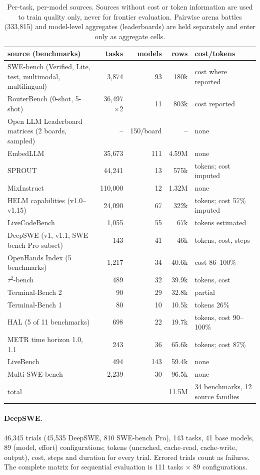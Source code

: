 \documentclass[11pt,a4paper]{article}
\theoremstyle{definition}
\theoremstyle{remark}
\theoremstyle{definition}
\begin{document}
\begin{table}[h]
\centering\small
\begin{tabularx}{\textwidth}{Xrrrl}\toprule
source (benchmarks) & tasks & models & rows & cost/tokens\\\midrule
SWE-bench (Verified, Lite, test, multimodal, multilingual) & 3{,}874 & 93 & 180k & cost where reported\\
RouterBench (0-shot, 5-shot) & 36{,}497$\times$2 & 11 & 803k & cost reported\\
Open LLM Leaderboard matrices (2 boards, sampled) & -- & 150/board & -- & none\\
EmbedLLM & 35{,}673 & 111 & 4.59M & none\\
SPROUT & 44{,}241 & 13 & 575k & tokens; cost imputed\\
MixInstruct & 110{,}000 & 12 & 1.32M & none\\
HELM capabilities (v1.0--v1.15) & 24{,}090 & 67 & 322k & tokens; cost 57\% imputed\\
LiveCodeBench & 1{,}055 & 55 & 67k & tokens estimated\\
DeepSWE (v1, v1.1, SWE-bench Pro subset) & 143 & 41 & 46k & tokens, cost, steps\\
OpenHands Index (5 benchmarks) & 1{,}217 & 34 & 40.6k & cost 86--100\%\\
$\tau^2$-bench & 489 & 32 & 39.9k & tokens, cost\\
Terminal-Bench 2 & 90 & 29 & 32.8k & partial\\
Terminal-Bench 1 & 80 & 10 & 10.5k & tokens 26\%\\
HAL (5 of 11 benchmarks) & 698 & 22 & 19.7k & tokens, cost 90--100\%\\
METR time horizon 1.0, 1.1 & 243 & 36 & 65.6k & tokens; cost 87\%\\
LiveBench & 494 & 143 & 59.4k & none\\
Multi-SWE-bench & 2{,}239 & 30 & 96.5k & none\\
\midrule
total & & & 11.5M & 34 benchmarks, 12 source families\\
\bottomrule\end{tabularx}
\caption{Per-task, per-model sources. Sources without cost or token information are used to train quality only, never for frontier evaluation. Pairwise arena battles (333{,}815) and model-level aggregates (leaderboards) are held separately and enter only as aggregate cells.}
\end{table}

\paragraph{DeepSWE.} 46{,}345 trials (45{,}535 DeepSWE, 810 SWE-bench Pro), 143 tasks, 41 base models, 89 (model, effort) configurations; tokens (uncached, cache-read, cache-write, output), cost, steps and duration for every trial. Errored trials count as failures. The complete matrix for sequential evaluation is 111 tasks $\times$ 89 configurations.
\end{document}
